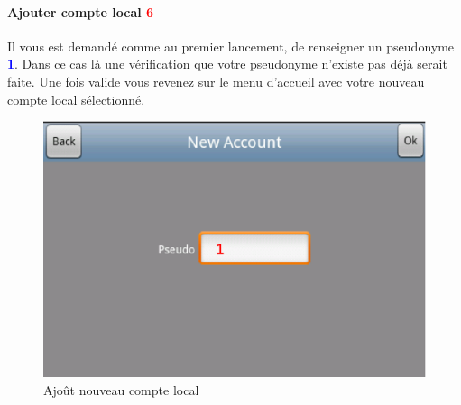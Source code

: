 \paragraph{Ajouter compte local \textcolor{red}{6}\\}
	Il vous est demandé comme au premier lancement, de renseigner un pseudonyme 
	\textcolor{blue}{\textbf{1}}. Dans ce cas là une vérification que votre
	pseudonyme n'existe pas déjà serait faite. Une fois valide vous revenez sur le menu d'accueil avec votre
	nouveau compte local sélectionné.
	\begin{figure}[h]
	\centering
		\includegraphics[scale=0.6]{Manuel/Img/9.eps}
		\caption{Ajoût nouveau compte local}
	\end{figure}
	
	
